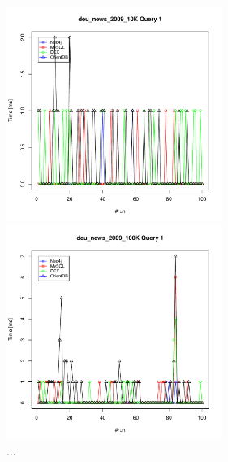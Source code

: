 \documentclass[11pt, a4paper, oneside]{article} %
\begin{document}
\begin{appendix}
\begin{figure}[ht]
\begin{minipage}[hbt]{7cm}
	\centering
	\includegraphics[width=7cm]{../results/cold caches/images/10K_query1_perf}
	\caption{...}
	\label{fig:10k_query2_perf}
\end{minipage}
\hfill
\begin{minipage}[hbt]{7cm}
	\centering
	\includegraphics[width=7cm]{../results/cold caches/images/100K_query1_perf}
	\caption{...}
	\label{fig:100k_query1_perf}
\end{minipage}


\end{figure}
\end{appendix}
\end{document}
